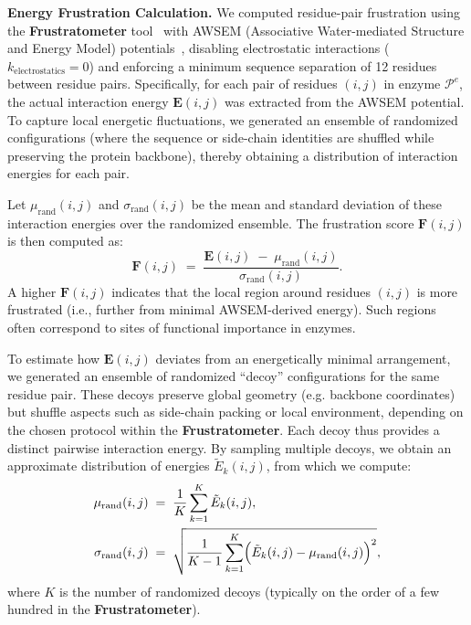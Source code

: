 \textbf{Energy Frustration Calculation.} 
We computed residue-pair frustration using the \textbf{Frustratometer} tool~\cite{Frustratometer} with AWSEM (Associative Water-mediated Structure and Energy Model) potentials~\cite{AWSEM}, disabling electrostatic interactions ($k_{\mathrm{electrostatics}}=0$) and enforcing a minimum sequence separation of 12 residues between residue pairs. Specifically, for each pair of residues \((i,j)\) in enzyme \(\mathcal{P}^e\), the actual interaction energy \(\mathbf{E}(i,j)\) was extracted from the AWSEM potential. To capture local energetic fluctuations, we generated an ensemble of randomized configurations (where the sequence or side-chain identities are shuffled while preserving the protein backbone), thereby obtaining a distribution of interaction energies for each pair.

Let \(\mu_{\mathrm{rand}}(i,j)\) and \(\sigma_{\mathrm{rand}}(i,j)\) be the mean and standard deviation of these interaction energies over the randomized ensemble. The frustration score \(\mathbf{F}(i,j)\) is then computed as:
\begin{equation}
    \mathbf{F}(i,j) \;=\; \frac{ \mathbf{E}(i,j) \;-\; \mu_{\mathrm{rand}}(i,j) }{ \sigma_{\mathrm{rand}}(i,j) }.
\end{equation}
A higher \(\mathbf{F}(i,j)\) indicates that the local region around residues \((i,j)\) is more frustrated (i.e., further from minimal AWSEM-derived energy). Such regions often correspond to sites of functional importance in enzymes.

To estimate how \(\mathbf{E}(i,j)\) deviates from an energetically minimal arrangement, we generated an ensemble of randomized ``decoy'' configurations for the same residue pair. These decoys preserve global geometry (e.g. backbone coordinates) but shuffle aspects such as side-chain packing or local environment, depending on the chosen protocol within the \textbf{Frustratometer}. Each decoy thus provides a distinct pairwise interaction energy. By sampling multiple decoys, we obtain an approximate distribution of energies \(\tilde{E}_k(i,j)\), from which we compute:
\begin{align}
    \mu_{\mathrm{rand}}(i,j) \;&=\; \frac{1}{K}\sum_{k=1}^{K} \tilde{E}_k(i,j), \\
    \sigma_{\mathrm{rand}}(i,j) \;&=\; \sqrt{\frac{1}{K-1}\sum_{k=1}^{K} \Bigl(\tilde{E}_k(i,j) - \mu_{\mathrm{rand}}(i,j)\Bigr)^2},
\end{align}
where \(K\) is the number of randomized decoys (typically on the order of a few hundred in the \textbf{Frustratometer}).





